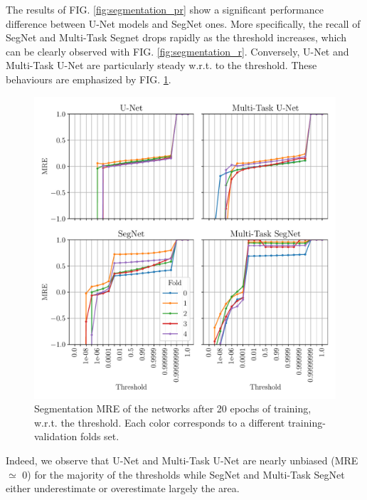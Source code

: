 \documentclass[twocolumn,superscriptaddress,aps,nofootinbib]{revtex4-1}
\begin{document}
The results of FIG. \ref{fig:segmentation_pr} show a significant performance difference between U-Net models and SegNet ones. More specifically, the recall of SegNet and Multi-Task Segnet drops rapidly as the threshold increases, which can be clearly observed with FIG. \ref{fig:segmentation_r}. Conversely, U-Net and Multi-Task U-Net are particularly steady w.r.t. to the threshold. These behaviours are emphasized by FIG. \ref{fig:segmentation_mre}.

\begin{figure}[h]
    \centering
    \vspace{-1em}
    \includegraphics[width=\columnwidth]{resources/pdf/segmentation_mre.pdf}
    \vspace{-2em}
    \caption{Segmentation MRE of the networks after 20 epochs of training, w.r.t. the threshold. Each color corresponds to a different training-validation folds set.}
    \label{fig:segmentation_mre}
\end{figure}

Indeed, we observe that U-Net and Multi-Task U-Net are nearly unbiased (MRE $\simeq$ 0) for the majority of the thresholds while SegNet and Multi-Task SegNet either underestimate or overestimate largely the area.

\vspace{1em}
\end{document}
